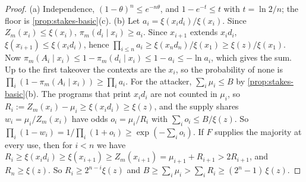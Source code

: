 \begin{proof}
(a) Independence, $(1-\theta)^n\le e^{-n\theta}$, and $1-e^{-t}\le t$ with $t=\ln2/n$; the floor is
\cref{prop:stakes-basic}(c). (b) Let $a_i=\xi(x_id_i)/\xi(x_i)$. Since $Z_m(x_i)\le\xi(x_i)$, $\pi_m(d_i\mid
x_i)\ge a_i$. Since $x_{i+1}$ extends $x_id_i$, $\xi(x_{i+1})\le\xi(x_id_i)$, hence $\prod_{i\le
n}a_i\ge\xi(x_nd_n)/\xi(x_1)\ge\xi(z)/\xi(x_1)$. Now $\pi_m(A_i\mid x_i)\le1-\pi_m(d_i\mid
x_i)\le1-a_i\le-\ln a_i$, which gives the sum. Up to the first takeover the contexts are the $x_i$, so the
probability of none is $\prod_i(1-\pi_m(A_i\mid x_i))\ge\prod_ia_i$. For the attacker, $\sum_i\mu_i\le B$ by
\cref{prop:stakes-basic}(b). The programs that print $x_id_i$ are not counted in $\mu_i$, so
$R_i:=Z_m(x_i)-\mu_i\ge\xi(x_id_i)\ge\xi(z)$, and the supply shares $w_i=\mu_i/Z_m(x_i)$ have odds
$o_i=\mu_i/R_i$ with $\sum_io_i\le B/\xi(z)$. So $\prod_i(1-w_i)=1/\prod_i(1+o_i)\ge\exp(-\sum_io_i)$. If
$F$ supplies the majority at every use, then for $i<n$ we have $R_i\ge\xi(x_id_i)\ge\xi(x_{i+1})\ge
Z_m(x_{i+1})=\mu_{i+1}+R_{i+1}>2R_{i+1}$, and $R_n\ge\xi(z)$. So $R_i\ge2^{n-i}\xi(z)$ and
$B\ge\sum_i\mu_i>\sum_iR_i\ge(2^n-1)\,\xi(z)$.
\end{proof}

